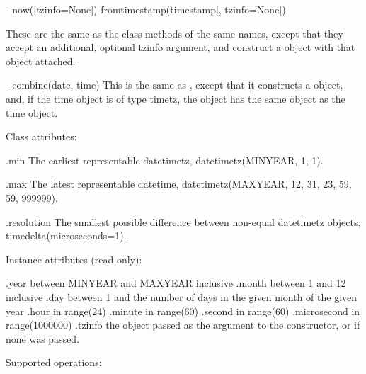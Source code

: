   - now([tzinfo=None])
    fromtimestamp(timestamp[, tzinfo=None])

    These are the same as the  class methods of the same names,
    except that they accept an additional, optional tzinfo argument, and
    construct a  object with that  object attached.

  - combine(date, time)
    This is the same as , except that it constructs
    a  object, and, if the time object is of type timetz,
    the  object has the same  object as the time object.

Class attributes:

    .min
        The earliest representable datetimetz,
        datetimetz(MINYEAR, 1, 1).

    .max
        The latest representable datetime,
        datetimetz(MAXYEAR, 12, 31, 23, 59, 59, 999999).

    .resolution
        The smallest possible difference between non-equal datetimetz
        objects, timedelta(microseconds=1).

Instance attributes (read-only):

    .year           between MINYEAR and MAXYEAR inclusive
    .month          between 1 and 12 inclusive
    .day            between 1 and the number of days in the given month
                    of the given year
    .hour           in range(24)
    .minute         in range(60)
    .second         in range(60)
    .microsecond    in range(1000000)
    .tzinfo         the object passed as the  argument to
                    the  constructor, or 
                    if none was passed.

Supported operations:

